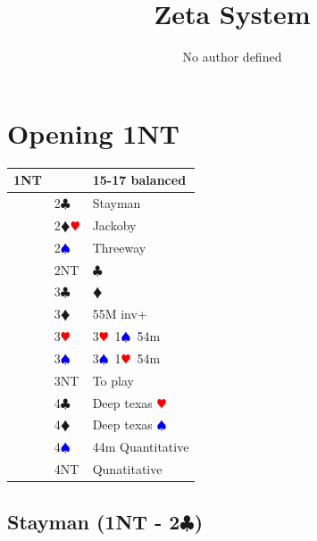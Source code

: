 \documentclass[a4paper]{article}
\title{Zeta System}
\author{No author defined}
\newcommand{\BC}{\textcolor{OliveGreen}{$\clubsuit$}}
\newcommand{\BD}{\textcolor{RedOrange}{$\vardiamondsuit$}}
\newcommand{\BH}{\textcolor{Red}{$\varheartsuit${}}}
\newcommand{\BS}{\textcolor{Blue}{$\spadesuit${}}}
\newcommand{\pdfc}{\texorpdfstring{\BC{}}{C}}
\begin{document}
\maketitle
\tableofcontents

\section{Opening  1NT}

\begingroup
\renewcommand{\arraystretch}{1.4}
\begin{xltabular}{\linewidth}{|l|l|X|}
\hline
1NT &  & 15-17 balanced \\
\hline
 & 2\BC & Stayman \\
\hline
 & 2\BD\BH & Jackoby \\
\hline
 & 2\BS & Threeway \\
\hline
 & 2NT & \BC \\
\hline
 & 3\BC & \BD \\
\hline
 & 3\BD & 55M inv+ \\
\hline
 & 3\BH & 3\BH\ 1\BS\ 54m \\
\hline
 & 3\BS & 3\BS\ 1\BH\ 54m \\
\hline
 & 3NT & To play \\
\hline
 & 4\BC & Deep texas \BH \\
\hline
 & 4\BD & Deep texas \BS \\
\hline
 & 4\BS & 44m Quantitative \\
\hline
 & 4NT & Qunatitative \\
\hline
\end{xltabular}
\endgroup
\bigbreak
\subsection{Stayman (1NT - 2\pdfc)}
\end{document}
